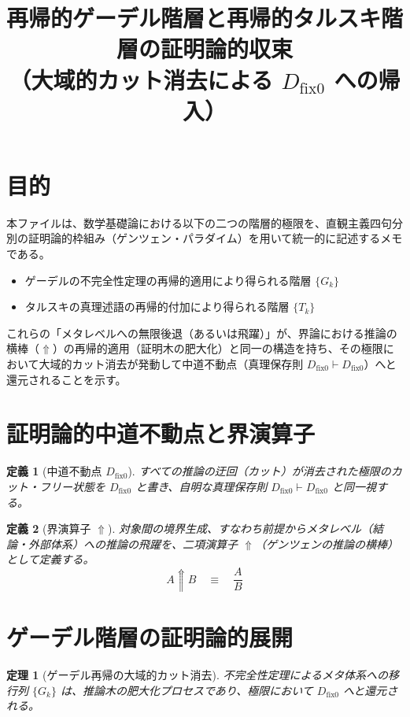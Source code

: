 \documentclass[12pt,a4paper]{article}
\newcommand{\dfix}{D_{\mathrm{fix}0}} %
\newcommand{\metanegation}{\Uparrow} %
\newtheorem{theorem}{定理}[section]
\newtheorem{definition}{定義}[section]
\begin{document}
\title{再帰的ゲーデル階層と再帰的タルスキ階層の証明論的収束\\（大域的カット消去による $\dfix$ への帰入）}
\author{}
\date{}
\maketitle

\section{目的}
本ファイルは、数学基礎論における以下の二つの階層的極限を、直観主義四句分別の証明論的枠組み（ゲンツェン・パラダイム）を用いて統一的に記述するメモである。
\begin{itemize}
  \item ゲーデルの不完全性定理の再帰的適用により得られる階層 $\{G_k\}$
  \item タルスキの真理述語の再帰的付加により得られる階層 $\{T_k\}$
\end{itemize}
これらの「メタレベルへの無限後退（あるいは飛躍）」が、界論における推論の横棒（$\metanegation$）の再帰的適用（証明木の肥大化）と同一の構造を持ち、その極限において大域的カット消去が発動して中道不動点（真理保存則 $\dfix \vdash \dfix$）へと還元されることを示す。

\section{証明論的中道不動点と界演算子}
\begin{definition}[中道不動点 $\dfix$]
すべての推論の迂回（カット）が消去された極限のカット・フリー状態を $\dfix$ と書き、自明な真理保存則 $\dfix \vdash \dfix$ と同一視する。
\end{definition}

\begin{definition}[界演算子 $\metanegation$]
対象間の境界生成、すなわち前提からメタレベル（結論・外部体系）への推論の飛躍を、二項演算子 $\metanegation$（ゲンツェンの推論の横棒）として定義する。
\[
  A \metanegation B \quad \equiv \quad \frac{A}{B}
\]
\end{definition}

\section{ゲーデル階層の証明論的展開}
\begin{theorem}[ゲーデル再帰の大域的カット消去]
不完全性定理によるメタ体系への移行列 $\{G_k\}$ は、推論木の肥大化プロセスであり、極限において $\dfix$ へと還元される。
\end{theorem}
\end{document}
